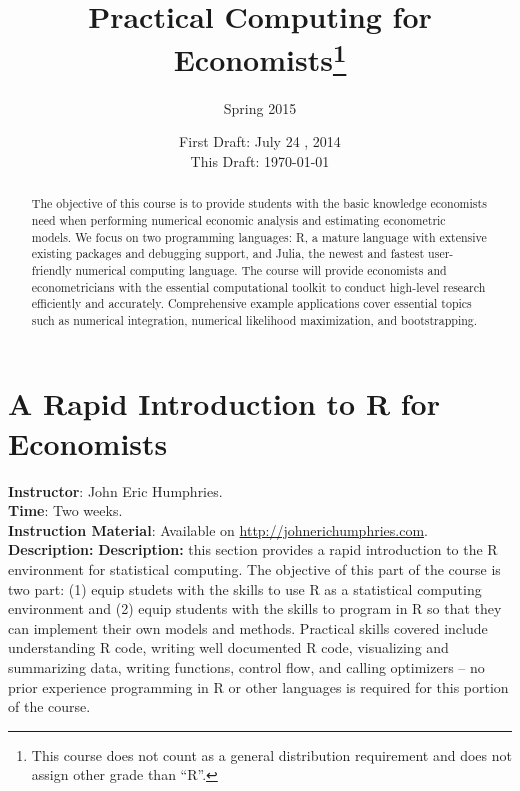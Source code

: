 




\title{\textbf{Practical Computing for Economists}\footnote{This course does not count as a general distribution requirement and does not assign other grade than ``R''. }}
\author{Spring 2015}
\date{First Draft: July 24 , 2014 \\ This Draft: \today}
\maketitle

\begin{abstract}
\noindent The objective of this course is to provide students with the basic knowledge economists need when performing numerical economic analysis and estimating econometric models.  We focus on two programming languages: R, a mature language with extensive existing packages and debugging support, and Julia, the newest and fastest user-friendly numerical computing language. The course will provide economists and econometricians with the essential computational toolkit to conduct high-level research efficiently and accurately. Comprehensive example applications cover essential topics such as numerical integration, numerical likelihood maximization, and bootstrapping. \end{abstract}


\section{A Rapid Introduction to R for Economists}
\noindent \textbf{Instructor}: John Eric Humphries.\\
\noindent \textbf{Time}: Two weeks.\\
\noindent \textbf{Instruction Material}: Available on \href{http://johnerichumphries.com}{http://johnerichumphries.com}.\\
\noindent \textbf{Description:} \noindent \textbf{Description:} this section provides a rapid introduction to the R environment for statistical computing. The objective of this part of the course is two part: (1) equip studets with the skills to use R as a statistical computing environment and (2) equip students with the skills to program in R so that they can implement their own models and methods. Practical skills covered include understanding R code, writing well documented R code, visualizing and summarizing data, writing functions, control flow, and calling optimizers -- no prior experience programming in R or other languages is required for this portion of the course. 

